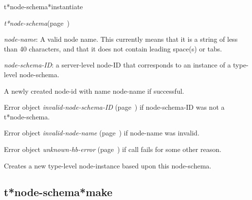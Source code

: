 \begin{description}
\item [Name:]  t*node-schema*instantiate

\item [Class:] {\sl t*node-schema}\hfill(page~\pageref{t*node-schema})

\item [Parameters:]
\item {\sl node-name}:  
A valid node name. This currently means that it is a
string of less than 40 characters, and that it does
not contain leading space(s) or tabs.

\item {\sl node-schema-ID}:  a server-level node-ID that corresponds to an 
instance of a type-level node-schema. 



\item [Return-value:] 
A newly created node-id with name node-name if successful.

Error object {\sl invalid-node-schema-ID} (page~\pageref{invalid-node-schema-ID}) if 
node-schema-ID was not a t*node-schema.

Error object {\sl invalid-node-name} (page~\pageref{invalid-node-name}) if node-name was
invalid.

Error object {\sl unknown-hb-error} (page~\pageref{unknown-hb-error}) if call fails
for some other reason.

\item [Description:]

Creates a new type-level node-instance based upon this
node-schema.

\item [Public:]



\end{description}
\horizontalline

\subsection{t*node-schema*make}
\label{t*node-schema*make}

